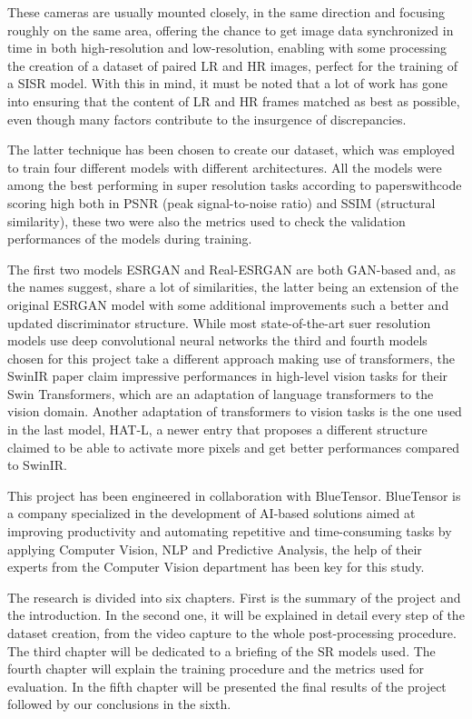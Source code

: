 These cameras are usually mounted closely, in the same direction and focusing roughly on the same area, offering the chance to get image data synchronized in time in both high-resolution and low-resolution, enabling with some processing the creation of a dataset of paired LR and HR images, perfect for the training of a SISR model. With this in mind, it must be noted that a lot of work has gone into ensuring that the content of LR and HR frames matched as best as possible, even though many factors contribute to the insurgence of discrepancies.

The latter technique has been chosen to create our dataset, which was employed to train four different models with different architectures. All the models were among the best performing in super resolution tasks according to paperswithcode \cite{pwcode} scoring high both in PSNR\cite{psnr} (peak signal-to-noise ratio) and SSIM\cite{ssim} (structural similarity), these two were also the metrics used to check the validation performances of the models during training.

The first two models ESRGAN\cite{wang2018esrgan} and Real-ESRGAN\cite{wang2021realesrgan} are both GAN-based and, as the names suggest, share a lot of similarities, the latter being an extension of the original ESRGAN model with some additional improvements such a better and updated discriminator structure. While most state-of-the-art suer resolution models use deep convolutional neural networks the third and fourth models chosen for this project take a different approach making use of transformers, the SwinIR\cite{liang2021swinir} paper claim impressive performances in high-level vision tasks for their Swin Transformers\cite{liu2021swin}, which are an adaptation of language transformers to the vision domain. Another adaptation of transformers to vision tasks is the one used in the last model, HAT-L\cite{chen2023activating}, a newer entry that proposes a different structure claimed to be able to activate more pixels and get better performances compared to SwinIR.

This project has been engineered in collaboration with BlueTensor. BlueTensor is a company specialized in the development of AI-based solutions aimed at improving productivity and automating repetitive and time-consuming tasks by applying Computer Vision, NLP and Predictive Analysis, the help of their experts from the Computer Vision department has been key for this study.

The research is divided into six chapters. First is the summary of the project and the introduction. In the second one, it will be explained in detail every step of the dataset creation, from the video capture to the whole post-processing procedure. The third chapter will be dedicated to a briefing of the SR models used. The fourth chapter will explain the training procedure and the metrics used for evaluation. In the fifth chapter will be presented the final results of the project followed by our conclusions in the sixth.

